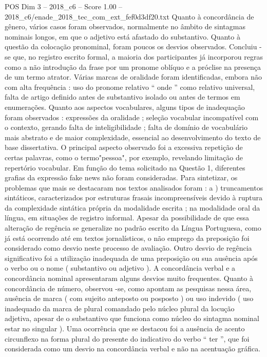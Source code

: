 \begin{textsample}{POS Dim 3 – 2018\_c6 – Score 1.00 – 2018\_c6/enade\_2018\_tec\_com\_ext\_fef0d3df20.txt}
Quanto à concordância de gênero, vários casos foram observados, normalmente no âmbito de sintagmas nominais longos, em que o adjetivo está afastado do substantivo.
Quanto à questão da colocação pronominal, foram poucos os desvios observados.
Concluiu -se que, no registro escrito formal, a maioria dos participantes já incorporou regras como a não introdução da frase por um pronome oblíquo e a próclise na presença de um termo atrator.
Várias marcas de oralidade foram identificadas, embora não com alta frequência : uso do pronome relativo “ onde ” como relativo universal, falta de artigo definido antes de substantivo isolado ou antes de termos em enumerações.
Quanto aos aspectos vocabulares, alguns tipos de inadequação foram observados : expressões da oralidade ; seleção vocabular incompatível com o contexto, gerando falta de inteligibilidade ; falta de domínio de vocabulário mais abstrato e de maior complexidade, essencial ao desenvolvimento do texto de base dissertativa.
O principal aspecto observado foi a excessiva repetição de certas palavras, como o termo"pessoa", por exemplo, revelando limitação de repertório vocabular.
Em função do tema solicitado na Questão 1, diferentes grafias da expressão fake news não foram consideradas.
Para sintetizar, os problemas que mais se destacaram nos textos analisados foram : a ) truncamentos sintáticos, caracterizados por estruturas frasais incompreensíveis devido à ruptura da complexidade sintática própria da modalidade escrita ; na modalidade oral da língua, em situações de registro informal.
Apesar da possibilidade de que essa alteração de regência se generalize no padrão escrito da Língua Portuguesa, como já está ocorrendo até em textos jornalísticos, o não emprego da preposição foi considerado como desvio neste processo de avaliação.
Outro desvio de regência significativo foi a utilização inadequada de uma preposição ou sua ausência após o verbo ou o nome ( substantivo ou adjetivo ).
A concordância verbal e a concordância nominal apresentaram alguns desvios muito frequentes.
Quanto à concordância de número, observou -se, como apontam as pesquisas nessa área, ausência de marca ( com sujeito anteposto ou posposto ) ou uso indevido ( uso inadequado da marca de plural comandado pelo núcleo plural da locução adjetiva, apesar de o substantivo que funciona como núcleo do sintagma nominal estar no singular ).
Uma ocorrência que se destacou foi a ausência de acento circunflexo na forma plural do presente do indicativo do verbo “ ter ”, que foi considerada como um desvio na concordância verbal e não na acentuação gráfica.

\end{textsample}
